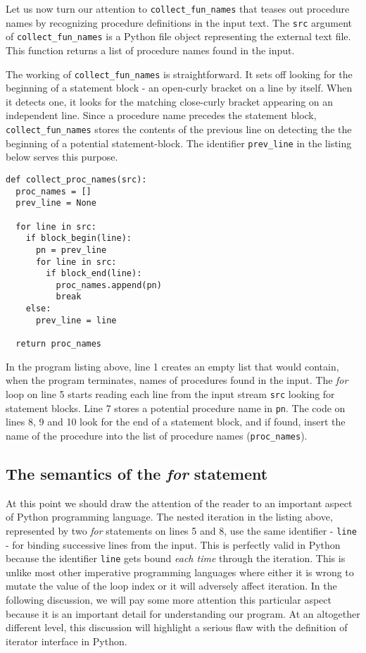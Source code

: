 \documentclass[10pt, a4paper]{article}
\begin{document}
Let us now turn our attention to \texttt{collect\_fun\_names} that teases out procedure names by recognizing procedure definitions in the input text. The \texttt{src} argument of \texttt{collect\_fun\_names} is a Python file object representing the external text file. This function returns a list of procedure names found in the input. 

The working of \texttt{collect\_fun\_names} is straightforward. It sets off looking for the beginning of a statement block - an open-curly bracket on a line by itself. When it detects one, it looks for the matching close-curly bracket appearing on an independent line. Since a procedure name precedes the statement block, \texttt{collect\_fun\_names} stores the contents of the previous line on detecting the the beginning of a potential statement-block. The identifier \texttt{prev\_line} in the listing below serves this purpose. 

\noindent\begin{lstlisting}
def collect_proc_names(src):
  proc_names = []
  prev_line = None

  for line in src:
    if block_begin(line):
      pn = prev_line
      for line in src:
        if block_end(line):
          proc_names.append(pn)
          break
    else:
      prev_line = line

  return proc_names
\end{lstlisting}

In the program listing above, line 1 creates an empty list that would contain, when the program terminates, names of procedures found in the input. The \textit{for} loop on line 5 starts reading each line from the input stream \texttt{src} looking for statement blocks. Line 7 stores a potential procedure name in \texttt{pn}. The code on lines 8, 9 and 10 look for the end of a statement block, and if found, insert the name of the procedure into the list of procedure names (\texttt{proc\_names}).

\subsection{The semantics of the \textit{for} statement}
At this point we should draw the attention of the reader to an important aspect of Python programming language. The nested iteration in the listing above, represented by two \textit{for} statements on lines 5 and 8, use the same identifier - \texttt{line} - for binding successive lines from the input. This is perfectly valid in Python because the identifier \texttt{line} gets bound \textit{each time} through the iteration. This is unlike most other imperative programming languages where either it is wrong to mutate the value of the loop index or it will adversely affect iteration. In the following discussion, we will pay some more attention this particular aspect because it is an important detail for understanding our program. At an altogether different level, this discussion will highlight a serious flaw with the definition of iterator interface in Python.
\end{document}
